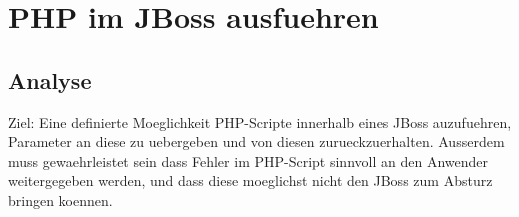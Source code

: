 \chapter{PHP im JBoss ausfuehren}
\label{sec:chap2}


\section{Analyse}
\label{sec:chap2:analysis}
Ziel: Eine definierte Moeglichkeit PHP-Scripte innerhalb eines JBoss 
        auzufuehren, Parameter an diese zu uebergeben und von diesen
                zurueckzuerhalten. Ausserdem muss gewaehrleistet sein dass Fehler im
                        PHP-Script sinnvoll an den Anwender weitergegeben werden, und dass
                                diese moeglichst nicht den JBoss zum Absturz bringen koennen.





